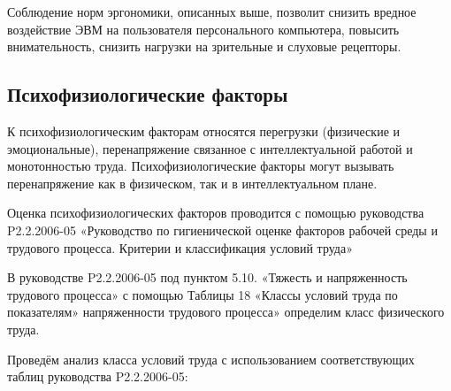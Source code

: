 Соблюдение норм эргономики, описанных выше, позволит снизить вредное воздействие ЭВМ на пользователя персонального компьютера, повысить вни\-мательность, снизить наг\-рузки на зрительные и слуховые рецепторы.

\subsection{Психофизиологические факторы}

К психофизиологическим факторам относятся перегрузки (физические и эмоциональ\-ные), перенапряжение связанное с интеллектуальной работой и монотонностью труда. Психофи\-зиологические факторы могут вызывать перенапряжение как в физическом, так и в интел\-лектуальном плане.

Оценка психофизиологических факторов проводится с помощью руковод\-ства P2.2.2006-05 «Руководство по гигиенической оценке факторов рабочей среды и трудового процесса. Критерии и классификация условий труда»

В руководстве P2.2.2006-05 под пунктом 5.10. «Тяжесть и напряженность трудового процесса» с помощью Таблицы 18 «Классы условий труда по по\-казателям» напряженности трудового процесса» определим класс физичес\-кого труда.

Проведём анализ класса условий труда с использованием соответству\-ющих таблиц руководства P2.2.2006-05:

